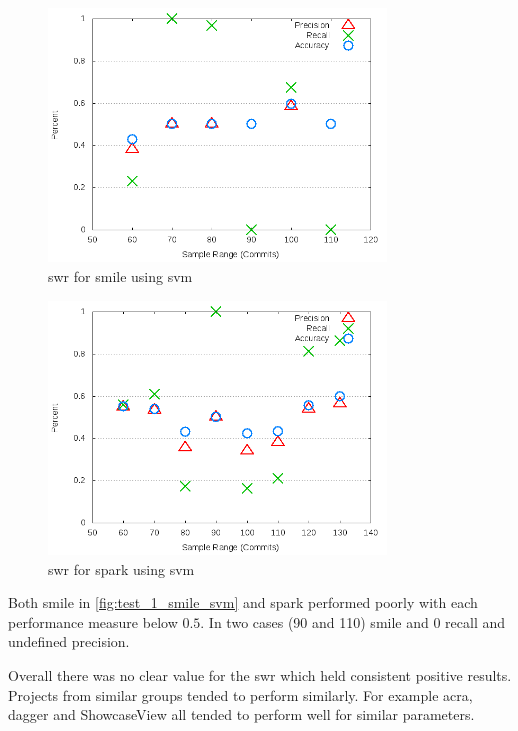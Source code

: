 \begin{figure}[!ht]
    \centering

        \includegraphics[width=0.8\textwidth]{images/svm/test_1/smile_sample_range}
        \caption{\gls{swr} for smile using \gls{svm}}
        \label{fig:test_1_smile_svm}
\end{figure}

\begin{figure}[!ht]
    \centering

        \includegraphics[width=0.8\textwidth]{images/svm/test_1/spark_sample_range}
        \caption{\gls{swr} for spark using \gls{svm}}
        \label{fig:test_1_spark_svm}
\end{figure}

Both smile in \autoref{fig:test_1_smile_svm} and spark performed poorly with each performance measure below $0.5$. In two cases (90 and 110) smile and 0 recall and undefined precision.

Overall there was no clear value for the \gls{swr} which held consistent positive results. Projects from similar groups tended to perform similarly. For example acra, dagger and ShowcaseView all tended to perform well for similar parameters. 

